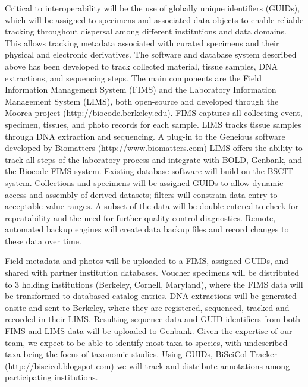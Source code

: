 \documentclass[11pt]{article}
\begin{document}
Critical to interoperability will be the use of globally unique
identifiers (GUIDs), which will be assigned to specimens and
associated data objects to enable reliable tracking throughout
dispersal among different institutions and data domains. This allows
tracking metadata associated with curated specimens and their physical
and electronic derivatives. The software and database system described
above has been developed to track collected material, tissue samples,
DNA extractions, and sequencing steps. The main components are the
Field Information Management System (FIMS) and the Laboratory
Information Management System (LIMS), both open-source and developed
through the Moorea project (\url{http://biocode.berkeley.edu}). FIMS
captures all collecting event, specimen, tissues, and photo records
for each sample. LIMS tracks tissue samples through DNA extraction and
sequencing. A plug-in to the Geneious software developed by Biomatters
(\url{http://www.biomatters.com}) LIMS offers the ability to track all
steps of the laboratory process and integrate with BOLD, Genbank, and
the Biocode FIMS system. Existing database software will build on the
BSCIT system. Collections and specimens will be assigned GUIDs to
allow dynamic access and assembly of derived datasets; filters will
constrain data entry to acceptable value ranges. A subset of the data
will be double entered to check for repeatability and the need for
further quality control diagnostics. Remote, automated backup engines
will create data backup files and record changes to these data over
time.

Field metadata and photos will be uploaded to a FIMS, assigned GUIDs,
and shared with partner institution databases. Voucher specimens will
be distributed to 3 holding institutions (Berkeley, Cornell,
Maryland), where the FIMS data will be transformed to databased
catalog entries. DNA extractions will be generated onsite and sent to
Berkeley, where they are registered, sequenced, tracked and recorded
in their LIMS. Resulting sequence data and GUID identifiers from both
FIMS and LIMS data will be uploaded to Genbank. Given the expertise of
our team, we expect to be able to identify most taxa to species, with
undescribed taxa being the focus of taxonomic studies. Using GUIDs,
BiSciCol Tracker (\url{http://biscicol.blogspot.com}) we will track
and distribute annotations among participating institutions.
\end{document}
